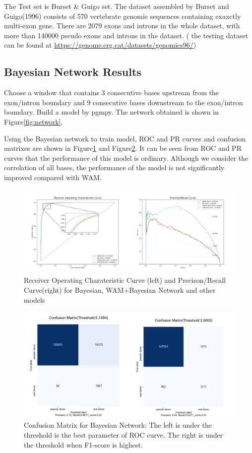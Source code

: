 \documentclass{gapd}
\begin{document}
The Test set is Burset \& Guigo set. The dataset assembled by Burset
and Guigo(1996) consists of 570 vertebrate genomic sequences containing
exaxctly multi-exon gene. There are 2079 exons and introns in the whole
dataset, with more than 140000 pseudo exons and introns in the dataset.
( the testing dataset can be found at
\url{https://genome.crg.cat/datasets/genomics96/})

\subsection{Bayesian Network Results}\label{bayesian-network-results}

Choose a window that contains 3 consecutive bases upstream from the
exon/intron boundary and 9 consecutive bases downstream to the
exon/intron boundary. Build a model by pgmpy. The network obtained is
shown in Figure\ref{fig:network}.


Using the Bayesian network to train model, ROC and PR curves and
confusion matrixes are shown in Figure\ref{fig:WBplot} and Figure\ref{fig:BNmatrix}. It can be seen from ROC
and PR curves that the performance of this model is ordinary. Although
we consider the correlation of all bases, the performance of the model
is not significantly improved compared with WAM.


\begin{figure}[hb]
  \centering
  \includegraphics[width=1\linewidth]{assets/image-20210624154804096.png}
  \caption{Receiver Operating Charateristic Curve (left) and Precison/Recall
  Curve(right) for Bayesian, WAM+Bayesian Network and other models}
  \label{fig:WBplot}
\end{figure}

\begin{figure}[h]
  \centering
  \includegraphics[width=0.8\linewidth]{assets/image-20210624154725944.png}
  \caption{Confusion Matrix for Bayesian Network: The left is under the threshold is
  the best parameter of ROC curve. The right is under the threshold when
  F1-score is highest.}
  \label{fig:BNmatrix}
\end{figure}
  
\end{document}
